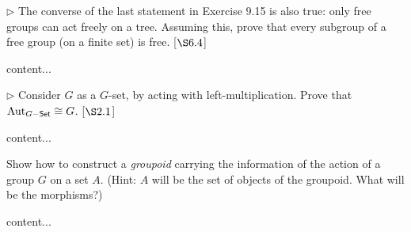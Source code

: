 \begin{exercise}
	$\triangleright$ The converse of the last statement in Exercise 9.15 is also true: only free groups can act freely on a tree. Assuming this, prove that every subgroup of a free group (on a finite set) is free. [$\S 6.4$]
\end{exercise}
\begin{solution}
	content...
\end{solution}

\begin{exercise}
	$\triangleright$ Consider $G$ as a $G$-set, by acting with left-multiplication. Prove that $\operatorname{Aut}_{G-\textsf{Set}}\cong G$. [$\S 2.1$]
\end{exercise}
\begin{solution}
	content...
\end{solution}


\begin{exercise}
	Show how to construct a \emph{groupoid} carrying the information of the action of a group $G$ on a set $A$. (Hint: $A$ will be the set of objects of the groupoid. What will be the morphisms?)
\end{exercise}
\begin{solution}
	content...
\end{solution}